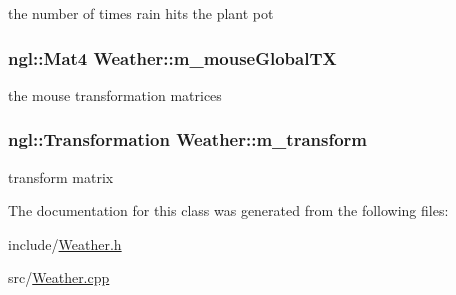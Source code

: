 the number of times rain hits the plant pot \hypertarget{classWeather_a4785be21c9bf7a7a67645fc08729d66e}{
\subsubsection[{m\_\-mouseGlobalTX}]{\setlength{\rightskip}{0pt plus 5cm}ngl::Mat4 {\bf Weather::m\_\-mouseGlobalTX}}}
\label{classWeather_a4785be21c9bf7a7a67645fc08729d66e}


the mouse transformation matrices \hypertarget{classWeather_a7b932337076098438c197a9a1903a057}{
\subsubsection[{m\_\-transform}]{\setlength{\rightskip}{0pt plus 5cm}ngl::Transformation {\bf Weather::m\_\-transform}}}
\label{classWeather_a7b932337076098438c197a9a1903a057}


transform matrix 

The documentation for this class was generated from the following files:\begin{DoxyCompactItemize}
\item 
include/\hyperlink{Weather_8h}{Weather.h}\item 
src/\hyperlink{Weather_8cpp}{Weather.cpp}\end{DoxyCompactItemize}
